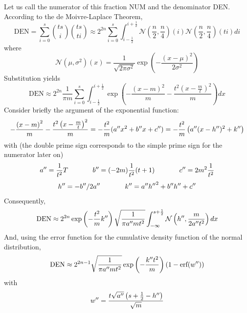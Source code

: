 \documentclass[12pt]{article}
\begin{document}
Let us call the numerator of this fraction NUM and the denominator
DEN. According to the de Moivre-Laplace Theorem,
\begin{displaymath}
  \mbox{DEN}=\sum_{i=0}^{s}\binom{ts}{i}\binom{ts}{ti}\approx{}2^{2n}\sum_{i=0}^{s}\int_{i-\frac{1}{2}}^{i+\frac{1}{2}}\mathcal{N}(\frac{n}{2},\frac{n}{4})(i)\mathcal{N}(\frac{n}{2},\frac{n}{4})(ti)di
\end{displaymath}
where
\begin{displaymath}
  \mathcal{N}(\mu,\sigma^{2})(x)=\frac{1}{\sqrt{2\pi\sigma^{2}}}\exp\left(-\frac{(x-\mu)^{2}}{2\sigma^{2}}\right)
\end{displaymath}
Substitution yields
\begin{displaymath}
  \mbox{DEN}\approx{}2^{2n}\frac{1}{\pi{}m}\sum_{i=0}^{s}\int_{i-\frac{1}{2}}^{i+\frac{1}{2}}\exp\left(-\frac{\left(x-m\right)^{2}}{m}-\frac{t^{2}\left(x-\frac{m}{t}\right)^{2}}{m}\right)dx
\end{displaymath}
Consider briefly the argument of the exponential function:
\begin{displaymath}
  -\frac{\left(x-m\right)^{2}}{m}-\frac{t^{2}\left(x-\frac{m}{t}\right)^{2}}{m}=-\frac{t^{2}}{m}({a''}x^{2}+{b''}x+{c''})=-\frac{t^{2}}{m}\left({a''}(x-{h''})^{2}+{k''}\right)
\end{displaymath}
with (the double prime sign corresponds to the simple prime sign for
the numerator later on)
\begin{displaymath}
{a''}=\frac{1}{t^{2}}{T}\notag\hspace{.5in}
{b''}=(-2m)\frac{1}{t^{2}}(t+1)\hspace{.5in}
{c''}=2m^{2}\frac{1}{t^{2}}
\end{displaymath}
\begin{displaymath}
{h''}=-{b''}/2{a''}\hspace{.5in}
{k''}={a''}{h''}^{2}+{b''}{h''}+{c''}
\end{displaymath}
Consequently,
\begin{displaymath}
\mbox{DEN}\approx{}2^{2n}\exp\left(-\frac{t^{2}}{m}{k''}\right)\sqrt{\frac{1}{\pi{}{a''}mt^{2}}}\int_{-\infty}^{s+\frac{1}{2}}\mathcal{N}\left({h''},\frac{m}{2{a''}t^{2}}\right)dx
\end{displaymath}
And, using the error function for the cumulative density function of
the normal distribution,
\begin{equation}
  \label{eq:den}
  \mbox{DEN}\approx{}2^{2n-1}\sqrt{\frac{1}{\pi{}{a''}mt^{2}}}\exp\left(-\frac{{k''}t^{2}}{m}\right)\left(1-\mbox{erf}({w''})\right)
\end{equation}
with
\begin{displaymath}
  {w''}=\frac{t\sqrt{{a''}}\left(s+\frac{1}{2}-{h''}\right)}{\sqrt{m}}
\end{displaymath}
\end{document}
